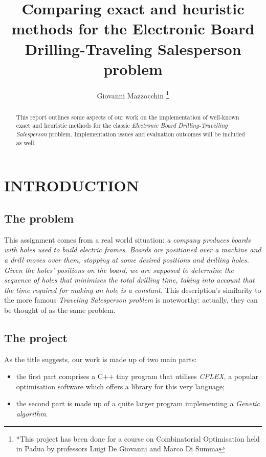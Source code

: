 \documentclass[letterpaper, 10 pt, conference]{ieeeconf}  %
\title{\LARGE \bf
\hspace*{ 0.5 in}Comparing exact and heuristic methods for the  \newline Electronic Board Drilling-Traveling Salesperson problem
}
\author{Giovanni Mazzocchin
\thanks{*This project has been done for a course on Combinatorial Optimisation held in Padua by professors Luigi De Giovanni and Marco Di Summa}%
}
\begin{document}
\maketitle
\thispagestyle{empty}
\pagestyle{empty}


\begin{abstract}
This report outlines some aspects of our work on the implementation of well-known exact and heuristic methods for the classic \textit{Electronic Board Drilling-Travelling Salesperson} problem.
Implementation issues and evaluation outcomes will be included as well.
\end{abstract}


\section{INTRODUCTION}
\subsection{The problem}
This assignment comes from a real world situation: \newline \textit{a company produces boards with holes used to build electric frames. Boards are positioned over a machine and a drill moves over them, stopping at some desired positions
and drilling holes. Given the holes' positions on the board, we are supposed to determine the sequence of holes that minimises the total drilling time, taking into account
that the time required for making an hole is a constant.} \newline 
This description's similarity to the more famous \textit{Traveling Salesperson problem} is noteworthy: actually,
they can be thought of as the same problem.
\subsection{The project} 
As the title suggests, our work is made up of two main parts:
\begin{itemize}
\item the first part comprises a C++ tiny program that utilises \textit{CPLEX}, a popular optimisation software which offers a library for this very language;
\item the second part is made up of a quite larger program implementing a \textit{Genetic algorithm}. 
\end{itemize}
\end{document}
